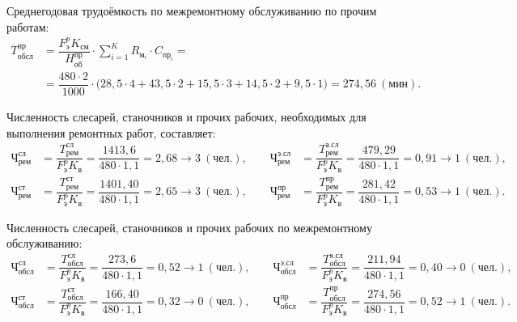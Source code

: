 \vspace{-3mm}
Среднегодовая трудоёмкость по межремонтному обслуживанию по
прочим работам:
{\small
\begin{align*}
  T^{\text{пр}}_{\text{обсл}} &= 
  \dfrac{
    F^p_{\text{э}} K_{см}
  }{
    H^{\text{пр}}_{\text{об}}
  } \cdot \sum^K_{i=1} R_{\text{м}_i} \cdot C_{\text{пр}_i} = \\
  &= \dfrac{480 \cdot 2}{1000}
    \cdot
    \big(
      28{,}5 \cdot 4 + 43{,}5 \cdot 2 + 15{,}5 \cdot 3 + 
      14{,}5 \cdot 2 + 9{,}5 \cdot 1
    \big) =
    274{,}56 \: (\text{мин}).
\end{align*}
}

Численность слесарей, станочников и прочих рабочих, необходимых
для выполнения ремонтных работ, составляет:
{\small
\begin{align*}
  \text{Ч}^{\text{сл}}_{\text{рем}} &= 
  \dfrac{
    T^{\text{сл}}_{\text{рем}}
  }{
    F^{p}_{\text{э}} K_{\text{в}}
  } =
  \dfrac{1413{,}6}{480 \cdot 1{,}1} = 
  2{,}68 \rightarrow 3 \: (\text{чел.}), 
  \qquad
  \text{Ч}^{\text{э.сл}}_{\text{рем}} &= 
  \dfrac{
    T^{\text{э.сл}}_{\text{рем}}
  }{
    F^{p}_{\text{э}} K_{\text{в}}
  } =
  \dfrac{479{,}29}{480 \cdot 1{,}1} = 
  0{,}91 \rightarrow 1 \: (\text{чел.}), 
  \\
  \text{Ч}^{\text{ст}}_{\text{рем}} &= 
  \dfrac{
    T^{\text{ст}}_{\text{рем}}
  }{
    F^{p}_{\text{э}} K_{\text{в}}
  } =
  \dfrac{1401{,}40}{480 \cdot 1{,}1} = 
  2{,}65 \rightarrow 3 \: (\text{чел.}), 
  \qquad
  \text{Ч}^{\text{пр}}_{\text{рем}} &= 
  \dfrac{
    T^{\text{пр}}_{\text{рем}}
  }{
    F^{p}_{\text{э}} K_{\text{в}}
  } =
  \dfrac{281{,}42}{480 \cdot 1{,}1} = 
  0{,}53 \rightarrow 1 \: (\text{чел.}). 
\end{align*}
}

\vspace{-3mm}
Численность слесарей, станочников и прочих рабочих
по межремонтному обслуживанию:
{\small
\begin{align*}
  \text{Ч}^{\text{сл}}_{\text{обсл}} &= 
  \dfrac{
    T^{\text{сл}}_{\text{обсл}}
  }{
    F^{p}_{\text{э}} K_{\text{в}}
  } =
  \dfrac{273{,}6}{480 \cdot 1{,}1} = 
  0{,}52 \rightarrow 1 \: (\text{чел.}), 
  \qquad
  \text{Ч}^{\text{э.сл}}_{\text{обсл}} &= 
  \dfrac{
    T^{\text{э.сл}}_{\text{обсл}}
  }{
    F^{p}_{\text{э}} K_{\text{в}}
  } =
  \dfrac{211{,}94}{480 \cdot 1{,}1} = 
  0{,}40 \rightarrow 0 \: (\text{чел.}), 
  \\
  \text{Ч}^{\text{ст}}_{\text{обсл}} &= 
  \dfrac{
    T^{\text{ст}}_{\text{обсл}}
  }{
    F^{p}_{\text{э}} K_{\text{в}}
  } =
  \dfrac{166{,}40}{480 \cdot 1{,}1} = 
  0{,}32 \rightarrow 0 \: (\text{чел.}), 
  \qquad
  \text{Ч}^{\text{пр}}_{\text{обсл}} &= 
  \dfrac{
    T^{\text{пр}}_{\text{обсл}}
  }{
    F^{p}_{\text{э}} K_{\text{в}}
  } =
  \dfrac{274{,}56}{480 \cdot 1{,}1} = 
  0{,}52 \rightarrow 1 \: (\text{чел.}). 
\end{align*}
}

